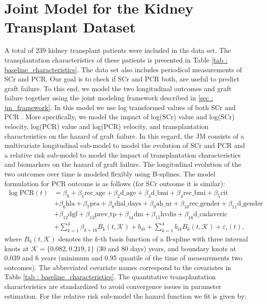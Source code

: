 
\section{Joint Model for the Kidney Transplant Dataset}
\label{sec : jm_amctx}
A total of 239 kidney transplant patients were included in the data set. The transplantation characteristics of these patients is presented in Table \ref{tab : baseline_characteristics}. The data set also includes periodical measurements of SCr and PCR. Our goal is to check if SCr and PCR both, are useful to predict graft failure. To this end, we model the two longitudinal outcomes and graft failure together using the joint modeling framework described in \ref{sec : jm_framework}. In this model we use log transformed values of both SCr and PCR \citep{fournier2016joint}. More specifically, we model the impact of log(SCr) value and log(SCr) velocity, log(PCR) value and log(PCR) velocity, and transplantation characteristics on the hazard of graft failure. In this regard, the JM consists of a multivariate longitudinal sub-model to model the evolution of SCr and PCR and a relative risk sub-model to model the impact of transplantation characteristics and biomarkers on the hazard of graft failure. The longitudinal evolution of the two outcomes over time is modeled flexibly using B-splines. The model formulation for PCR outcome is as follows (for SCr outcome it is similar):
\begin{equation}
\label{eq : long_model_prias}
\begin{aligned}
\log \mbox{PCR}(t) &= \beta_0 + \beta_1 \mbox{rec\_age} + \beta_2 \mbox{d\_age} + \beta_3 \mbox{d\_bmi} + \beta_4 \mbox{rec\_bmi} + \beta_5 \mbox{cit}\\
&+ \beta_6 \mbox{hla} + \beta_7 \mbox{pra}+ \beta_8 \mbox{dial\_days} + \beta_9 \mbox{ah\_nr} + \beta_{10} \mbox{rec\_gender} + \beta_{11} \mbox{d\_gender} \\
&+ \beta_{12} \mbox{dgf} + \beta_{13} \mbox{prev\_tp} + \beta_{14} \mbox{dm} + \beta_{15} \mbox{hvdis}+ \beta_{16} \mbox{d\_cadaveric}\\
&+\sum_{k=1}^4 \beta_{k+16} B_k(t,\mathcal{K}) +  b_{i0} + \sum_{k=1}^4 b_{ik} B_k(t,\mathcal{K}) + 
\varepsilon_i(t),
\end{aligned}
\end{equation}
where $B_k(t, \mathcal{K})$ denotes the $k$-th basis function of a B-spline with three internal knots at $\mathcal{K} =\{0.082, 0.219, 1\}$ (30 and 80 days) years, and boundary knots at 0.039 and 6 years (minimum and 0.95 quantile of the time of measurements two outcomes). The abbreviated covariate names correspond to the covariates in Table \ref{tab : baseline_characteristics}. The quantitative transplantation characteristics are standardized to avoid convergence issues in parameter estimation. For the relative risk sub-model the hazard function we fit is given by:
